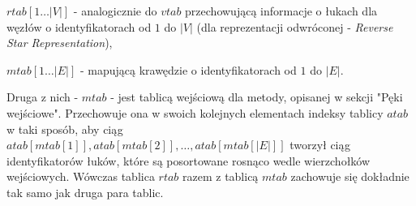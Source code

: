 \begin{myitemize}
	\item $rtab \left[ 1 \ldots \left| V \right| \right] $ - analogicznie do $vtab$ przechowującą informacje o łukach dla węzłów o identyfikatorach od $1$ do $ \left| V \right| $ (dla reprezentacji odwróconej - \textit{Reverse Star Representation}),
	\item $mtab \left[ 1 \ldots \left| E \right| \right] $ - mapującą krawędzie o identyfikatorach od $1$ do $ \left| E \right| $.
\end{myitemize}

Druga z nich - $mtab$ - jest tablicą wejściową dla metody, opisanej w sekcji "Pęki wejściowe". Przechowuje ona w swoich kolejnych elementach indeksy tablicy $atab$ w taki sposób, aby ciąg \\ $atab \left[ mtab \left[ 1 \right] \right], atab \left[ mtab \left[ 2 \right] \right], \ldots, atab \left[ mtab \left[ \left| E \right| \right] \right] $ tworzył ciąg identyfikatorów łuków, które są posortowane rosnąco wedle wierzchołków wejściowych. Wówczas tablica $rtab$ razem z tablicą $mtab$ zachowuje się dokładnie tak samo jak druga para tablic.

